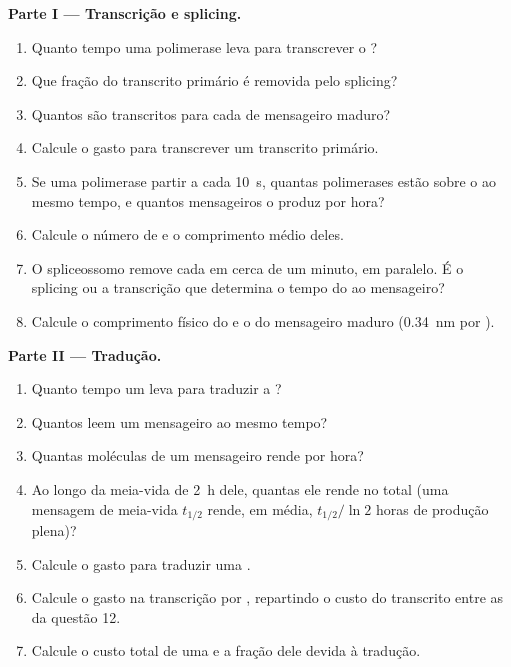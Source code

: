 \begin{problem}
\medskip
\noindent\textbf{Parte I --- Transcrição e splicing.}
\begin{enumerate}
  \item Quanto tempo uma polimerase leva para transcrever o ?
  \item Que fração do transcrito primário é removida pelo splicing?
  \item Quantos  são transcritos para cada  de
        mensageiro maduro?
  \item Calcule o  gasto para transcrever um transcrito primário.
  \item Se uma polimerase partir a cada \qty{10}{s}, quantas polimerases
        estão sobre o  ao mesmo tempo, e quantos mensageiros o 
        produz por hora?
  \item Calcule o número de  e o comprimento médio deles.
  \item O spliceossomo remove cada  em cerca de um minuto, em
        paralelo. É o splicing ou a transcrição que determina o tempo do
         ao mensageiro?
  \item Calcule o comprimento físico do  e o do mensageiro maduro
        (\qty{0.34}{nm} por ).
\end{enumerate}

\medskip
\noindent\textbf{Parte II --- Tradução.}
\begin{enumerate}[resume]
  \item Quanto tempo um  leva para traduzir a ?
  \item Quantos  leem um mensageiro ao mesmo tempo?
  \item Quantas moléculas de  um mensageiro rende por hora?
  \item Ao longo da meia-vida de \qty{2}{h} dele, quantas ele rende no
        total (uma mensagem de meia-vida $t_{1/2}$ rende, em média,
        $t_{1/2}/\ln 2$ horas de produção plena)?
  \item Calcule o  gasto para traduzir uma .
  \item Calcule o  gasto na transcrição por , repartindo o
        custo do transcrito entre as  da questão 12.
  \item Calcule o custo total de uma  e a fração dele devida à
        tradução.
\end{enumerate}


\end{problem}
